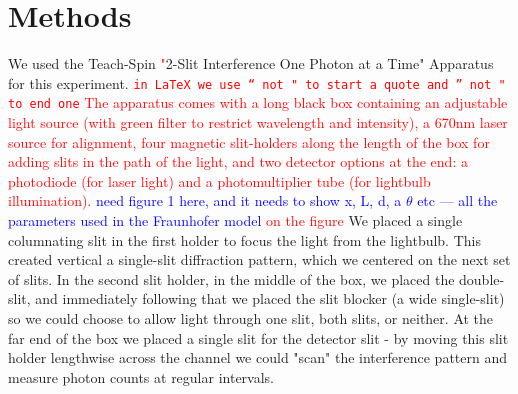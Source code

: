\documentclass[prb,preprint]{revtex4-1}
\begin{document}
\section{Methods}

We used the Teach-Spin\textcolor{red}{ "}2-Slit Interference One Photon at a Time" Apparatus for this experiment. \textcolor{red}{\texttt{in LaTeX we use `` not " to start a quote and '' not " to end one} The apparatus comes with a long black box containing an adjustable light source (with green filter to restrict wavelength and intensity), a 670nm laser source for alignment, four magnetic slit-holders along the length of the box for adding slits in the path of the light, and two detector options at the end: a photodiode (for laser light) and a photomultiplier tube (for lightbulb illumination). \textcolor{blue}{need figure 1 here, and it needs to show x, L, d, a  $\theta$ etc --- all the parameters used in the Fraunhofer model} on the figure}  We placed a single columnating slit in the first holder to focus the light from the lightbulb. This created vertical a single-slit diffraction pattern, which we centered on the next set of slits.  In the second slit holder, in the middle of the box, we placed the double-slit, and immediately following that we placed the slit blocker (a wide single-slit) so we could choose to allow light through one slit, both slits, or neither.  At the far end of the box we placed a single slit for the detector slit - by moving this slit holder lengthwise across the channel we could "scan" the interference pattern and measure photon counts at regular intervals.  
\end{document}
